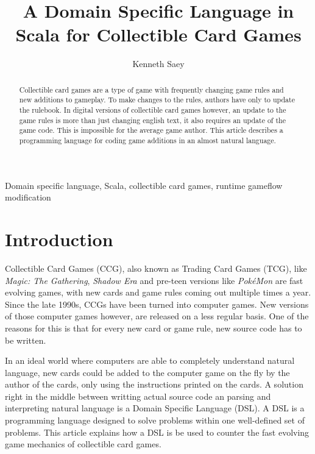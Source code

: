 \documentclass[twocolumn]{phdsymp}
\begin{document}
\title{A Domain Specific Language in Scala for Collectible Card Games} %

\author{Kenneth Saey}


\maketitle

\begin{abstract}
Collectible card games are a type of game with frequently changing game rules and new additions to gameplay. To make changes to the rules, authors have only to update the rulebook. In digital versions of collectible card games however, an update to the game rules is more than just changing english text, it also requires an update of the game code. This is impossible for the average game author. This article describes a programming language for coding game additions in an almost natural language.
\end{abstract}

\begin{keywords}
Domain specific language, Scala, collectible card games, runtime gameflow modification
\end{keywords}

\section{Introduction}
Collectible Card Games (CCG), also known as Trading Card Games (TCG), like \textit{Magic: The Gathering}, \textit{Shadow Era} and pre-teen versions like \textit{Pok\'eMon} are fast evolving games, with new cards and game rules coming out multiple times a year. Since the late 1990s, CCGs have been turned into computer games. New versions of those computer games however, are released on a less regular basis. One of the reasons for this is that for every new card or game rule, new source code has to be written.

In an ideal world where computers are able to completely understand natural language, new cards could be added to the computer game on the fly by the author of the cards, only using the instructions printed on the cards. A solution right in the middle between writting actual source code an parsing and interpreting natural language is a Domain Specific Language (DSL). A DSL is a programming language designed to solve problems within one well-defined set of problems. This article explains how a DSL is be used to counter the fast evolving game mechanics of collectible card games.
\end{document}
